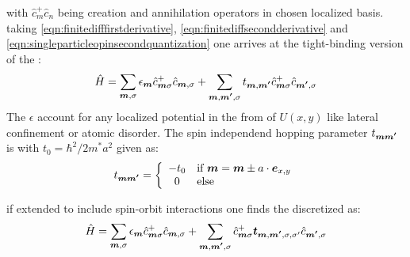 with $\hat{c}^+_m \hat{c}_n $ being creation and annihilation operators in chosen localized basis.
taking \ref{eqn:finitedifffirstderivative}, \ref{eqn:finitediffsecondderivative} and \ref{eqn:singleparticleopinsecondquantization} one arrives at the tight-binding version of the \hamil{} :
\begin{align}
	\hat{H} = \sum_{\boldsymbol{m},\sigma} \epsilon_{\boldsymbol{m}} \hat{c}^+_{\boldsymbol{m}\sigma} \hat{c}_{\boldsymbol{m},\sigma} +
	\sum_{\boldsymbol{m},\boldsymbol{m'},\sigma} t_{\boldsymbol{m},\boldsymbol{m'}} \hat{c}^+_{\boldsymbol{m}\sigma} \hat{c}_{\boldsymbol{m'},\sigma}
	\label{eqn:discretizedeffectivemassHamil}
\end{align}
The $\epsilon$ account for any localized potential in the from of $U(x,y)$ like lateral confinement or atomic disorder.
The spin independend hopping parameter $t_{\boldsymbol{m}\boldsymbol{m'}}$ is with $t_0 = \hbar^2/2m^*a^2$  given as:
\begin{align}
t_{\boldsymbol{m}\boldsymbol{m'}} = \left\{ \begin{array}[c]{cl} -t_0 & \text{if } \boldsymbol{m} = \boldsymbol{m} \pm a \cdot \boldsymbol{e}_{x,y} \\ 0 & \text{else} \end{array} \right.
	\label{eqn:t0hopping}
\end{align}

if extended to include spin-orbit interactions one finds the discretized \rash{} \hamil{} as:
\begin{align}
	\hat{H} = \sum_{\boldsymbol{m},\sigma} \epsilon_{\boldsymbol{m}} \hat{c}^+_{\boldsymbol{m}\sigma} \hat{c}_{\boldsymbol{m},\sigma} +
	\sum_{\boldsymbol{m},\boldsymbol{m'},\sigma}  \hat{c}^+_{\boldsymbol{m}\sigma} \boldsymbol{t}_{\boldsymbol{m},\boldsymbol{m'},\sigma,\sigma '} \hat{c}_{\boldsymbol{m'},\sigma}
	\label{eqn:discretizedrashbahamil}
\end{align}

